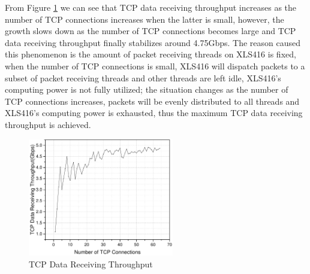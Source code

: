 \documentclass[conference]{IEEEtran}
\begin{document}
From Figure \ref{result} we can see that TCP data receiving throughput increases as the number of TCP connections increases when the latter is small, however, the growth slows down as the number of TCP connections becomes large and TCP data receiving throughput finally stabilizes around 4.75Gbps. The reason caused this phenomenon is the amount of packet receiving threads on XLS416 is fixed, when the number of TCP connections is small, XLS416 will dispatch packets to a subset of packet receiving threads and other threads are left idle, XLS416's computing power is not fully utilized; the situation changes as the number of TCP connections increases, packets will be evenly distributed to all threads and XLS416's computing power is exhausted, thus the maximum TCP data receiving throughput is achieved.
\begin{figure}[!t]
\centering
\includegraphics[width=2.5in]{oldresult}
\caption{TCP Data Receiving Throughput}
\label{result}
\end{figure}
\end{document}

